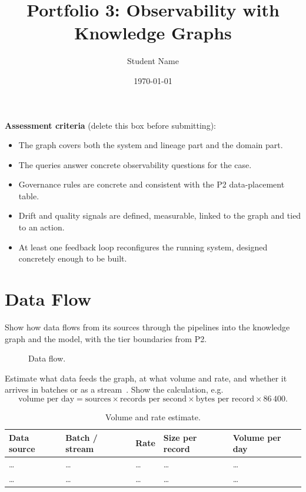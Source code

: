 \documentclass[report]{itvest}
\title{Portfolio 3: Observability with Knowledge Graphs}
\author{Student Name} %
\date{\today}
\begin{document}
\maketitle

\begin{checkit}
  \textbf{Assessment criteria} (delete this box before submitting):
  \begin{itemize}
    \item The graph covers both the system and lineage part and the domain
      part.
    \item The queries answer concrete observability questions for the case.
    \item Governance rules are concrete and consistent with the P2
      data-placement table.
    \item Drift and quality signals are defined, measurable, linked to the
      graph and tied to an action.
    \item At least one feedback loop reconfigures the running system,
      designed concretely enough to be built.
  \end{itemize}
\end{checkit}

\section{Data Flow}

Show how data flows from its sources through the pipelines into the
knowledge graph and the model, with the tier boundaries from P2.

\begin{figure}[h]
  \centering
  \caption{Data flow.}
  \label{fig:data-flow}
\end{figure}

Estimate what data feeds the graph, at what volume and rate, and whether it
arrives in batches or as a stream~\cite{huyen_designing_2022}. Show the
calculation, e.g.
\[
  \text{volume per day} =
  \text{sources} \times \text{records per second} \times
  \text{bytes per record} \times 86\,400 .
\]

\begin{table}[h]
  \centering
  \begin{tabularx}{\textwidth}{Xllll}
    \toprule
    Data source & Batch / stream & Rate & Size per record & Volume per day \\
    \midrule
    \ldots & \ldots & \ldots & \ldots & \ldots \\
    \ldots & \ldots & \ldots & \ldots & \ldots \\
    \bottomrule
  \end{tabularx}
  \caption{Volume and rate estimate.}
  \label{tab:volume}
\end{table}
\end{document}
